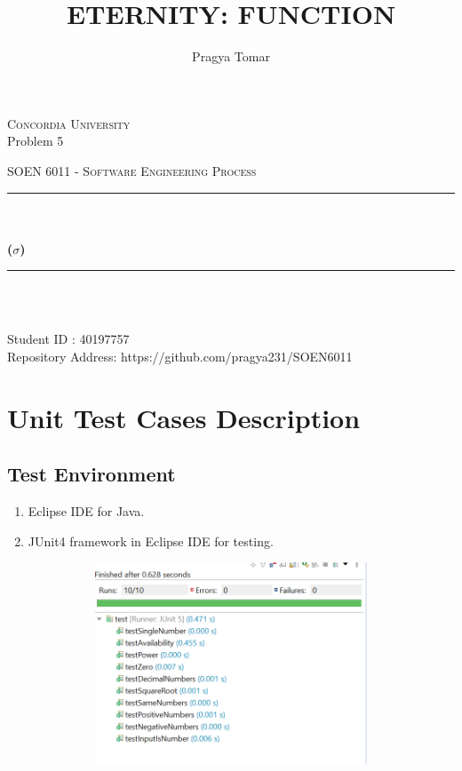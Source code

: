 \documentclass[12pt]{report}
\title{ETERNITY: FUNCTION}
\author{Pragya Tomar}
\date{}
\makeatletter
\let\thetitle\@title
\let\theauthor\@author
\makeatother
\begin{document}
\begin{titlepage}
	\centering
    \vspace*{1 cm}
\begin{center}    \textsc{\Large Concordia University}\\[2.5 cm]	
{Problem 5 }\\[0.4 cm]
\end{center}
	\textsc{\Large  SOEN 6011 - Software Engineering Process }\\[1 cm]
	\rule{\linewidth}{0.5 mm} \\[0.4 cm]
	{ \huge \textbf \thetitle}\\[0.5 cm]
	{ \huge \textbf{($\sigma$)}}
	\rule{\linewidth}{0.5 mm} \\[1.0 cm]

	
\begin{center}   {\Large \textbf{\theauthor}} \\[1 cm]
                 {\large Student ID : 40197757 }\\[0.4 cm]
                 {\large Repository Address: https://github.com/pragya231/SOEN6011}
\end{center}
	
\end{titlepage}

\tableofcontents
\pagebreak

\renewcommand{\thesection}{\arabic{section}}

\section{Unit Test Cases Description}

\subsection{Test Environment}
\begin{enumerate}
\item Eclipse IDE  for Java.
\item JUnit4 framework in Eclipse IDE for testing.
\end{enumerate}

\begin{center}
\includegraphics[width=15cm,height=6cm]{UnitTest}
\end{center}
\end{document}
